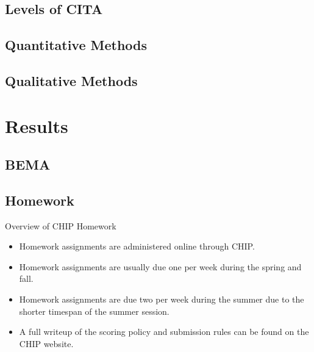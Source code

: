 \documentclass{beamer}
\begin{document}
\subsection*{Levels of CITA}
\subsection*{Quantitative Methods}
\subsection*{Qualitative Methods}

\section{Results}

\subsection*{BEMA}

\subsection*{Homework}

\begin{frame}{Overview of CHIP Homework}
  \begin{itemize}
    \item Homework assignments are administered online through CHIP.
    \item Homework assignments are usually due one per week during the spring and fall.
    \item Homework assignments are due two per week during the summer due to the shorter timespan of the summer session.
    \item A full writeup of the scoring policy and submission rules can be found on the CHIP website.
  \end{itemize}
\end{frame}
\end{document}
